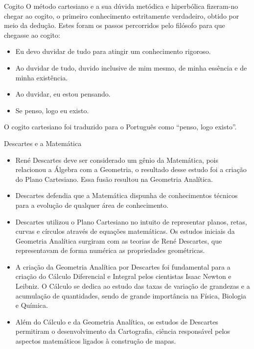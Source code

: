 \documentclass{beamer}
\begin{document}
\begin{frame}
    \begin{block}{Cogito}
O método cartesiano e a sua dúvida metódica e hiperbólica fizeram-no chegar ao cogito, o primeiro conhecimento estritamente verdadeiro, obtido por meio da dedução. Estes foram os passos percorridos pelo filósofo para que chegasse ao cogito:
        \begin{itemize}
            \item Eu devo duvidar de tudo para atingir um conhecimento rigoroso.
            \item Ao duvidar de tudo, duvido inclusive de mim mesmo, de minha essência e de minha existência.
            \item Ao duvidar, eu estou pensando.
            \item Se penso, logo eu existo.
        \end{itemize}
O cogito cartesiano foi traduzido para o Português como “penso, logo existo”.
    \end{block}  
\end{frame}


\begin{frame}{} 
    \begin{block}{Descartes e a Matemática}
        \begin{itemize}
            \item René Descartes deve ser considerado um gênio da Matemática, pois relacionou a Álgebra com a Geometria, o resultado desse estudo foi a criação do Plano Cartesiano. Essa fusão resultou na Geometria Analítica. \item Descartes defendia que a Matemática dispunha de conhecimentos técnicos para a evolução de qualquer área de conhecimento.
            \item Descartes utilizou o Plano Cartesiano no intuito de representar planos, retas, curvas e círculos através de equações matemáticas. Os estudos iniciais da Geometria Analítica surgiram com as teorias de René Descartes, que representavam de forma numérica as propriedades geométricas. 
        \end{itemize}
    \end{block} 
\end{frame}


\begin{frame}
    \begin{block}{}
        \begin{itemize}
            \item A criação da Geometria Analítica por Descartes foi fundamental para a criação do Cálculo Diferencial e Integral pelos cientistas Isaac Newton e Leibniz. O Cálculo se dedica ao estudo das taxas de variação de grandezas e a acumulação de quantidades, sendo de grande importância na Física, Biologia e Química.
            \item Além do Cálculo e da Geometria Analítica, os estudos de Descartes permitiram o desenvolvimento da Cartografia, ciência responsável pelos aspectos matemáticos ligados à construção de mapas.
        \end{itemize}
    \end{block}
\end{frame}
\end{document}

